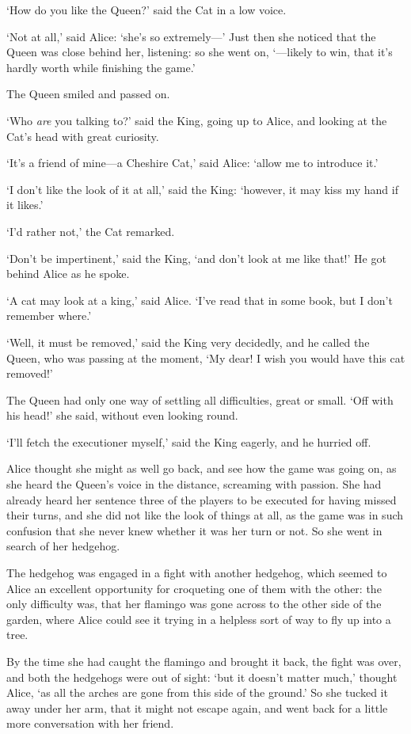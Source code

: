 \documentclass[12pt,openany]{memoir}
\begin{document}
`How do you like the Queen?' said the Cat in a low voice.

`Not at all,' said Alice: `she's so extremely---' Just then she noticed that the Queen was close behind her, listening: so she went on, `---likely to win, that it's hardly worth while finishing the game.'

The Queen smiled and passed on.

`Who \textit{are} you talking to?' said the King, going up to Alice, and looking at the Cat's head with great curiosity.

`It's a friend of mine---a Cheshire Cat,' said Alice: `allow me to introduce it.'

`I don't like the look of it at all,' said the King: `however, it may kiss my hand if it likes.'

`I'd rather not,' the Cat remarked.

`Don't be impertinent,' said the King, `and don't look at me like that!' He got behind Alice as he spoke.

`A cat may look at a king,' said Alice. `I've read that in some book, but I don't remember where.'

`Well, it must be removed,' said the King very decidedly, and he called the Queen, who was passing at the moment, `My dear! I wish you would have this cat removed!'

The Queen had only one way of settling all difficulties, great or small. `Off with his head!' she said, without even looking round.

`I'll fetch the executioner myself,' said the King eagerly, and he hurried off.

Alice thought she might as well go back, and see how the game was going on, as she heard the Queen's voice in the distance, screaming with passion. She had already heard her sentence three of the players to be executed for having missed their turns, and she did not like the look of things at all, as the game was in such confusion that she never knew whether it was her turn or not. So she went in search of her hedgehog.

The hedgehog was engaged in a fight with another hedgehog, which seemed to Alice an excellent opportunity for croqueting one of them with the other: the only difficulty was, that her flamingo was gone across to the other side of the garden, where Alice could see it trying in a helpless sort of way to fly up into a tree.

By the time she had caught the flamingo and brought it back, the fight was over, and both the hedgehogs were out of sight: `but it doesn't matter much,' thought Alice, `as all the arches are gone from this side of the ground.' So she tucked it away under her arm, that it might not escape again, and went back for a little more conversation with her friend.
\end{document}
